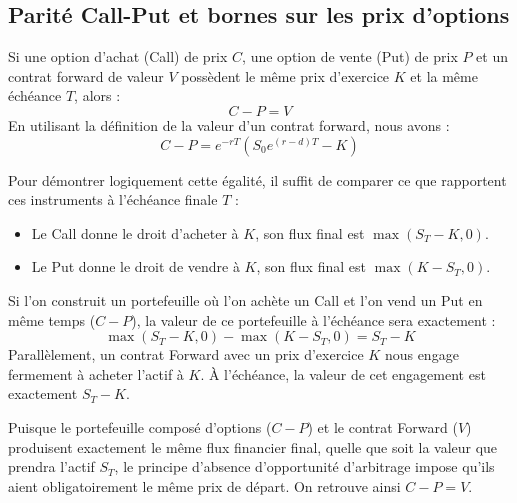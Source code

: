 \newpage

\subsection{Parité Call-Put et bornes sur les prix d'options}

\begin{theorembox}
Si une option d'achat (Call) de prix $C$, une option de vente (Put) de prix $P$ et un contrat forward de valeur $V$ possèdent le même prix d'exercice $K$ et la même échéance $T$, alors :
\begin{equation*}
    C - P = V
\end{equation*}
En utilisant la définition de la valeur d'un contrat forward, nous avons :
\begin{equation*}
    C - P = e^{-rT} (S_0 e^{(r-d)T} - K)
\end{equation*}
\end{theorembox}

\begin{proofbox}
Pour démontrer logiquement cette égalité, il suffit de comparer ce que rapportent ces instruments à l'échéance finale $T$ :
\begin{itemize}[label=$\rightarrow$]
    \item Le Call donne le droit d'acheter à $K$, son flux final est $\max(S_T - K, 0)$.
    \item Le Put donne le droit de vendre à $K$, son flux final est $\max(K - S_T, 0)$.
\end{itemize}
Si l'on construit un portefeuille où l'on achète un Call et l'on vend un Put en même temps ($C - P$), la valeur de ce portefeuille à l'échéance sera exactement :
\begin{equation*}
    \max(S_T - K, 0) - \max(K - S_T, 0) = S_T - K
\end{equation*}
Parallèlement, un contrat Forward avec un prix d'exercice $K$ nous engage fermement à acheter l'actif à $K$. À l'échéance, la valeur de cet engagement est exactement $S_T - K$.

Puisque le portefeuille composé d'options ($C - P$) et le contrat Forward ($V$) produisent exactement le même flux financier final, quelle que soit la valeur que prendra l'actif $S_T$, le principe d'absence d'opportunité d'arbitrage impose qu'ils aient obligatoirement le même prix de départ. On retrouve ainsi $C - P = V$.
\end{proofbox}

